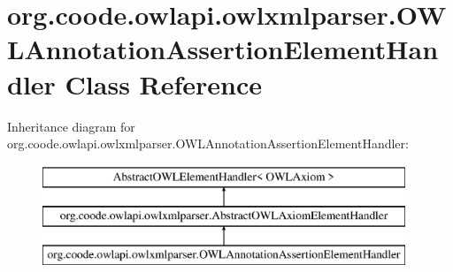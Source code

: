 \hypertarget{classorg_1_1coode_1_1owlapi_1_1owlxmlparser_1_1_o_w_l_annotation_assertion_element_handler}{\section{org.\-coode.\-owlapi.\-owlxmlparser.\-O\-W\-L\-Annotation\-Assertion\-Element\-Handler Class Reference}
\label{classorg_1_1coode_1_1owlapi_1_1owlxmlparser_1_1_o_w_l_annotation_assertion_element_handler}
}
Inheritance diagram for org.\-coode.\-owlapi.\-owlxmlparser.\-O\-W\-L\-Annotation\-Assertion\-Element\-Handler\-:\begin{figure}[H]
\begin{center}
\leavevmode
\includegraphics[height=3.000000cm]{classorg_1_1coode_1_1owlapi_1_1owlxmlparser_1_1_o_w_l_annotation_assertion_element_handler}
\end{center}
\end{figure}
